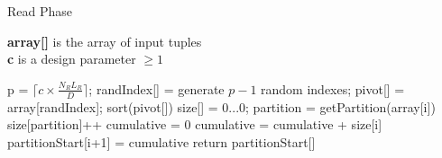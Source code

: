 \begin{algorithm}
\small
\caption{Read Phase}
\label{alg:read_phase}
\textbf{array[]} is the array of input tuples\\
\textbf{c} is a design parameter $\geq 1$\\
\begin{algorithmic}[1]
\State p = $\lceil c\times \frac{N_R L_R}{D} \rceil$;
\State randIndex[] = generate $p-1$ random indexes;
\State pivot[] = array[randIndex];
\State sort(pivot[])
\State size[] = {0...0};   
\State partition = getPartition(array[i]) 
\State size[partition]++ 
\EndFor
{}
\State cumulative = 0
\State cumulative = cumulative + size[i]
\State partitionStart[i+1] = cumulative
\EndFor
{}
\State return partitionStart[]
\end{algorithmic}

\end{algorithm}
